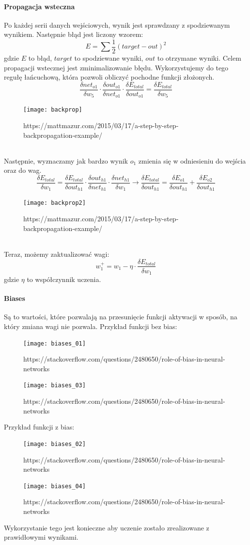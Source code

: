 \documentclass[12pt,a4paper]{article}
\begin{document}
\paragraph*{Propagacja wsteczna} 
Po każdej serii danych wejściowych, wynik jest sprawdzany z spodziewanym wynikiem. Następnie błąd jest liczony wzorem:
$$ E = \sum{\frac{1}{2}(target - out)^2} $$
gdzie $E$ to błąd, $target$ to spodziewane wyniki, $out$ to otrzymane wyniki.
Celem propagacji wstecznej jest zminimalizowanie błędu. Wykorzystujemy do tego regułę łańcuchową, która pozwoli obliczyć pochodne funkcji złożonych.
$$ \frac{\delta net_{o1}}{\delta w_5} \cdot \frac{\delta out_{o1}}{\delta net_{o1}} \cdot \frac{\delta E_{total}}{\delta out_{o1}} = \frac{\delta E_{total}}{\delta w_5} $$
\begin{figure}[hp]
\centering
\texttt{[image: backprop]}
\caption{https://mattmazur.com/2015/03/17/a-step-by-step-backpropagation-example/}
\end{figure}\\
Następnie, wyznaczamy jak bardzo wynik $o_1$ zmienia się w odniesieniu do wejścia oraz do wag. 
$$ \frac{\delta E_{total}}{\delta w_1}  = \frac{\delta E_{total}}{\delta out_{h1}} \cdot \frac{\delta out_{h1}}{\delta net_{h1}} \cdot \frac{\delta net_{h1}}{\delta w_1} \longrightarrow \frac{\delta E_{total}}{\delta out_{h1}} = \frac{\delta E_{o1}}{\delta out_{h1}} + \frac{\delta E_{o2}}{\delta out_{h1}}$$
\begin{figure}[h]
\centering
\texttt{[image: backprop2]}
\caption{https://mattmazur.com/2015/03/17/a-step-by-step-backpropagation-example/}
\end{figure}\\
Teraz, możemy zaktualizować wagi:
$$ w_1^+ = w_1 - \eta \cdot \frac{\delta E_{total}}{\delta w_1}  $$
gdzie $\eta$ to współczynnik uczenia.
\paragraph*{Biases} Są to wartości, które pozwalają na przesunięcie funkcji aktywacji w sposób, na który zmiana wagi nie pozwala. Przykład funkcji bez bias:
\begin{figure}[H]
\centering
\texttt{[image: biases\_01]}
\caption{https://stackoverflow.com/questions/2480650/role-of-bias-in-neural-networks}
\end{figure}
\begin{figure}[H]
\centering
\texttt{[image: biases\_03]}
\caption{https://stackoverflow.com/questions/2480650/role-of-bias-in-neural-networks}
\end{figure}
Przykład funkcji z bias:
\begin{figure}[H]
\centering
\texttt{[image: biases\_02]}
\caption{https://stackoverflow.com/questions/2480650/role-of-bias-in-neural-networks}
\end{figure}
\begin{figure}[H]
\centering
\texttt{[image: biases\_04]}
\caption{https://stackoverflow.com/questions/2480650/role-of-bias-in-neural-networks}
\end{figure}
Wykorzystanie tego jest konieczne aby uczenie zostało zrealizowane z prawidłowymi wynikami.
\end{document}
